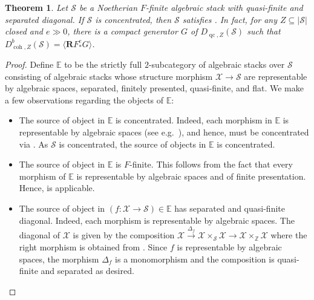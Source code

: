 \documentclass[11pt]{amsart}
\theoremstyle{plain}
\newtheorem{theorem}{Theorem}[section]
\theoremstyle{definition}
\numberwithin{equation}{section}
\numberwithin{theorem}{section}
\begin{document}
\begin{theorem}
    \label{thm:Frobenius_generation}
    Let $\mathcal{S}$ be a Noetherian $F$-finite algebraic stack with quasi-finite and separated diagonal. 
    If $\mathcal{S}$ is concentrated, then $\mathcal{S}$ satisfies . 
    In fact, for any $Z\subseteq |\mathcal{S}|$ closed and $e \gg 0$, there is a compact generator $G$ of $D_{\operatorname{qc},Z} (\mathcal{S})$ such that $D^b_{\operatorname{coh},Z}(\mathcal{S})= \langle \mathbf{R} F_\ast^e G \rangle$.
\end{theorem}

\begin{proof}
    Define $\mathbb{E}$ to be the strictly full $2$-subcategory of algebraic stacks over $\mathcal{S}$ consisting of algebraic stacks whose structure morphism $\mathcal{X} \to \mathcal{S}$ are representable by algebraic spaces, 
    separated, finitely presented, quasi-finite, and flat. 
    We make a few observations regarding the objects of $\mathbb{E}$:
    \begin{itemize}
        \item The source of object in $\mathbb{E}$ is concentrated. 
        Indeed, each morphism in $\mathbb{E}$ is representable by algebraic spaces (see e.g.\ \cite[Lemma 6.7]{DeDeyn/Lank/ManaliRahul:2025}), and hence, must be concentrated via \cite[Lemma 2.5(3)]{Hall/Rydh:2017}. 
        As $\mathcal{S}$ is concentrated, the source of objects in $\mathbb{E}$ is concentrated.
        \item The source of object in $\mathbb{E}$ is $F$-finite. 
        This follows from the fact that every morphism of $\mathbb{E}$ is representable by algebraic spaces and of finite presentation. 
        Hence,  is applicable.
        \item The source of object in $(f\colon \mathcal{X}\to \mathcal{S}) \in \mathbb{E}$ has separated and quasi-finite diagonal. 
        Indeed, each morphism is representable by algebraic spaces. 
        The diagonal of $\mathcal{X}$ is given by the composition $\mathcal{X} \xrightarrow{\Delta_f} \mathcal{X} \times_{\mathcal{S}}\mathcal{X} \to \mathcal{X} \times_{\mathbb{Z}}\mathcal{X}$ where the right morphism is obtained from \cite[\href{https://stacks.math.columbia.edu/tag/04Z1x}{Tag 04Z1}]{stacks-project}. 
        Since $f$ is representable by algebraic spaces, the morphism $\Delta_f$ is a monomorphism and the composition is quasi-finite and separated as desired.

\end{itemize}
\end{proof}
\end{document}
